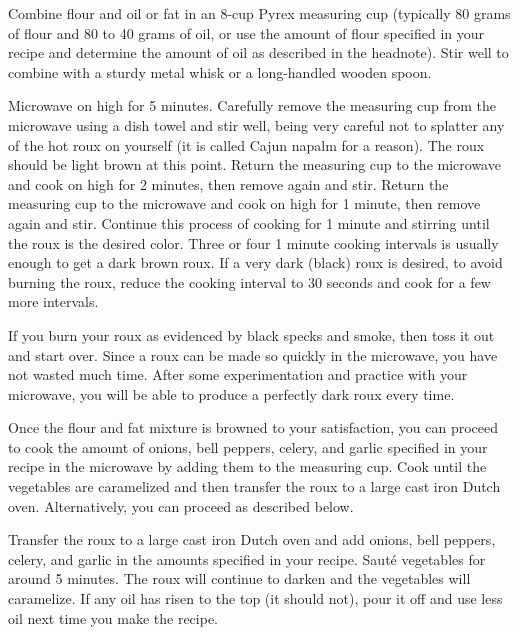 \documentclass[letterpaper]{recipePMG}
\begin{document}



Combine flour and oil or fat in an 8-cup Pyrex measuring cup (typically 80 grams of flour and 80 to 40 grams of oil, or use the amount of flour specified in your recipe and determine the amount of oil as described in the headnote). Stir well to combine with a sturdy metal whisk or a long-handled wooden spoon.

Microwave on high for 5 minutes.  Carefully remove the measuring cup from the microwave using a dish towel and stir well, being very careful not to splatter any of the hot roux on yourself (it is called Cajun napalm for a reason). The roux should be light brown at this point. Return the measuring cup to the microwave and cook on high for 2 minutes, then remove again and stir. Return the measuring cup to the microwave and cook on high for 1 minute, then remove again and stir. Continue this process of cooking for 1 minute and stirring until the roux is the desired color. Three or four 1 minute cooking intervals is usually enough to get a dark brown roux. If a very dark (black) roux is desired, to avoid burning the roux, reduce the cooking interval to 30 seconds and cook for a few more intervals. 

If you burn your roux as evidenced by black specks and smoke, then toss it out and start over.  Since a roux can be made so quickly in the microwave, you have not wasted much time.  After some experimentation and practice with your microwave, you will be able to produce a perfectly dark roux every time.

Once the flour and fat mixture is browned to your satisfaction, you can proceed to cook the amount of onions, bell peppers, celery, and garlic specified in your recipe in the microwave by adding them to the measuring cup. Cook until the vegetables are caramelized and then transfer the roux to a large cast iron Dutch oven. Alternatively, you can proceed as described below.

Transfer the roux to a large cast iron Dutch oven and add onions, bell peppers, celery, and garlic in the amounts specified in your recipe. Saut\'{e} vegetables for around 5 minutes. The roux will continue to darken and the vegetables will caramelize. If any oil has risen to the top (it should not), pour it off and use less oil next time you make the recipe.
\end{document}
